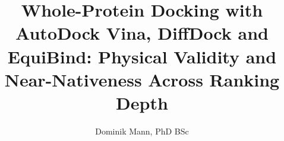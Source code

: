 \documentclass[Master,english,IEEE]{twbook}
\title{Whole-Protein Docking with AutoDock Vina, DiffDock and EquiBind: Physical Validity and Near-Nativeness Across Ranking Depth}
\author{Dominik Mann, PhD BSc}
\begin{document}
\nocite{ref001,ref002,ref003,ref004,ref005,ref006,ref007,ref008,ref009,ref010,ref011,ref012,ref013,ref014,ref015,ref016,ref017,ref018,ref019,ref020,ref021,ref022,ref023,ref024,ref025,ref026,ref027,ref028,ref030,ref031,ref032,ref033,ref035,ref037,ref038,ref040,ref041,ref043,ref044,ref045,ref046,ref047,ref048,ref049,ref050,ref052,ref054,ref055,ref056,ref057,ref058,ref059,ref060,ref061,ref062,ref063,ref064,ref065,ref066,ref067,ref068,ref069,ref070,ref071,ref072,ref073,ref075,ref076,ref079,ref080,ref081,ref082,ref083,ref084,ref086,ref087,ref088,ref089,ref090,ref091,ref092,ref093}
\maketitle
\end{document}
